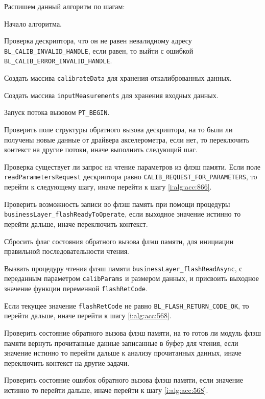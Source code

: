 Распишем данный алгоритм по шагам:
\begin{enumerate_step}
    \item Начало алгоритма.
    \item Проверка дескриптора, что он не равен невалидному адресу \lstinline|BL_CALIB_INVALID_HANDLE|, если равен, то выйти с ошибкой
    \lstinline|BL_CALIB_ERROR_INVALID_HANDLE|.
    \item Создать массива \lstinline|calibrateData| для хранения откалиброванных данных.
    \item Создать массива \lstinline|inputMeasurements| для хранения входных данных.
    \item Запуск потока вызовом \lstinline|PT_BEGIN|.
    \item \label{i:alg:acc:850} Проверить поле структуры обратного вызова дескриптора, на то были ли получены новые данные от драйвера акселерометра, 
    если нет, то переключить контекст на другие потоки, иначе выполнить следующий шаг.
    \item \label{i:alg:acc:857} Проверка существует ли запрос на чтение параметров из флэш памяти. Если поле \lstinline|readParametersRequest| дескриптора равно \lstinline|CALIB_REQUEST_FOR_PARAMETERS|,
    то перейти к следующему шагу, иначе перейти к шагу \ref{i:alg:acc:866}.
    \item Проверить возможность записи во флэш память при помощи процедуры \lstinline|businessLayer_flashReadyToOperate|, если выходное значение истинно то перейти дальше, иначе переключить контекст.
    \item Сбросить флаг состояния обратного вызова флэш памяти, для инициации правильной последовательности чтения.
    \item Вызвать процедуру чтения флэш памяти \lstinline|businessLayer_flashReadAsync|, с переданным параметром \lstinline|calibParams| и размером данных, и присвоить выходное значение функции переменной \lstinline|flashRetCode|.
    \item Если текущее значение \lstinline|flashRetCode| не равно \lstinline|BL_FLASH_RETURN_CODE_OK|, то перейти дальше, иначе перейти к шагу
    \ref{i:alg:acc:568}.
    \item Проверить состояние обратного вызова флэш памяти, на то готов ли модуль флэш памяти вернуть прочитанные данные записанные 
    в буфер для чтения, если значение истинно то перейти дальше к анализу прочитанных данных, иначе переключить контекст на другие задачи.
    \item Проверить состояние ошибок обратного вызова флэш памяти, если значение истинно то перейти дальше, иначе перейти к шагу \ref{i:alg:acc:568}.

\end{enumerate_step}

